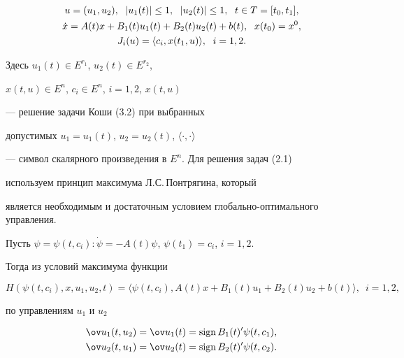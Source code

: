 \begin{exam}


\begin{gather}


u=(u_1,u_2),\ \; |u_1(t)|\leq 1,\ \; |u_2(t)|\leq 1,


\ \; t\in T=[t_0,t_1], \notag \\


%


\Dot x=A(t)x+B_1(t)u_1(t)+B_2(t)u_2(t)+b(t),\ \; x(t_0)=x^0, \\


%


J_i(u)=\langle c_i,x(t_1,u)\rangle,\ \; i=1,2. \notag


\end{gather}


Здесь $u_1(t)\in E^{{r_1}}$, $u_2(t)\in E^{{r_2}}$,


$x(t,u)\in E^n$, $c_i\in E^n$, $i=1,2$, $x(t,u)$


--- решение задачи Коши (3.2) при выбранных 


допустимых $u_1=u_1(t)$, $u_2=u_2(t)$, $\langle\cdot,\cdot\rangle$


--- символ скалярного произведения в $E^{n}$. Для решения задач (2.1)


используем принцип максимума Л.С.\,Понтрягина, который 


является необходимым и достаточным условием глобально-оптимального управления.


Пусть $\psi=\psi(t,c_i):\Dot \psi=-A(t)\psi$, $\psi(t_1)=c_i$, $i=1,2$.


Тогда из условий максимума функции


$$


H(\psi (t,c_i),x,u_1,u_2,t)=\langle\psi(t,c_i),A(t)x+


B_1(t)u_1+B_2(t)u_2+b(t)\rangle,\ \; i=1,2,


$$


по управлениям $u_1$ и $u_2$


\begin{equation}


\begin{split}


\ov u_1(t,u_2)&=\ov u_1(t)=\sign B_1(t)^{\prime}\psi(t,c_1),\\


\ov u_2(t,u_1)&=\ov u_2(t)=\sign B_2(t)^{\prime}\psi(t,c_2). 


\end{split}



\end{equation}
\end{exam}
